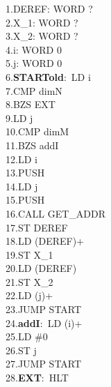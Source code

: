 \documentclass{article}
\begin{document}
\begin{minipage}{.4\textwidth}
        1.DEREF: WORD ?\\
        2.X\_1: WORD ?\\
        3.X\_2: WORD ?\\
        4.i: WORD 0\\
        5.j: WORD 0\\
        6.\textbf{STARTold}:\ LD i\\
        7.CMP dimN\\
        8.BZS EXT\\
        9.LD j\\
        10.CMP dimM\\
        11.BZS addI\\
        12.LD i\\
        13.PUSH\\
        14.LD j\\
        15.PUSH\\
        16.CALL GET\_ADDR\\
        17.ST DEREF\\
        18.LD (DEREF)+\\
        19.ST X\_1\\
        20.LD (DEREF)\\
        21.ST X\_2\\
        22.LD (j)+\\
        23.JUMP START\\
        24.\textbf{addI}:\ LD (i)+\\
        25.LD \#0\\
        26.ST j\\
        27.JUMP START\\
        28.\textbf{EXT}:\ HLT\\
\end{minipage}
\end{document}
